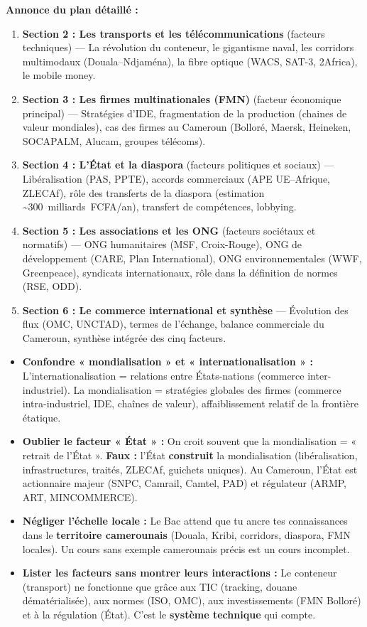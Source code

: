 \documentclass[11pt]{article}
\begin{document}
\textbf{Annonce du plan détaillé :}
\begin{enumerate}
    \item \textbf{Section 2 : Les transports et les télécommunications} (facteurs techniques) — La révolution du conteneur, le gigantisme naval, les corridors multimodaux (Douala–Ndjaména), la fibre optique (WACS, SAT-3, 2Africa), le mobile money.
    \item \textbf{Section 3 : Les firmes multinationales (FMN)} (facteur économique principal) — Stratégies d'IDE, fragmentation de la production (chaines de valeur mondiales), cas des firmes au Cameroun (Bolloré, Maersk, Heineken, SOCAPALM, Alucam, groupes télécoms).
    \item \textbf{Section 4 : L'État et la diaspora} (facteurs politiques et sociaux) — Libéralisation (PAS, PPTE), accords commerciaux (APE UE–Afrique, ZLECAf), rôle des transferts de la diaspora (estimation \textasciitilde \SI{300}{milliards FCFA/an}), transfert de compétences, lobbying.
    \item \textbf{Section 5 : Les associations et les ONG} (facteurs sociétaux et normatifs) — ONG humanitaires (MSF, Croix-Rouge), ONG de développement (CARE, Plan International), ONG environnementales (WWF, Greenpeace), syndicats internationaux, rôle dans la définition de normes (RSE, ODD).
    \item \textbf{Section 6 : Le commerce international et synthèse} — Évolution des flux (OMC, UNCTAD), termes de l'échange, balance commerciale du Cameroun, synthèse intégrée des cinq facteurs.
\end{enumerate}

\begin{attention}
\begin{itemize}
    \item \textbf{Confondre « mondialisation » et « internationalisation » :} L'internationalisation = relations entre États-nations (commerce inter-industriel). La mondialisation = stratégies globales des firmes (commerce intra-industriel, IDE, chaînes de valeur), affaiblissement relatif de la frontière étatique.
    \item \textbf{Oublier le facteur « État » :} On croit souvent que la mondialisation = « retrait de l'État ». \textbf{Faux :} l'État \textbf{construit} la mondialisation (libéralisation, infrastructures, traités, ZLECAf, guichets uniques). Au Cameroun, l'État est actionnaire majeur (SNPC, Camrail, Camtel, PAD) et régulateur (ARMP, ART, MINCOMMERCE).
    \item \textbf{Négliger l'échelle locale :} Le Bac attend que tu ancre tes connaissances dans le \textbf{territoire camerounais} (Douala, Kribi, corridors, diaspora, FMN locales). Un cours sans exemple camerounais précis est un cours incomplet.
    \item \textbf{Lister les facteurs sans montrer leurs interactions :} Le conteneur (transport) ne fonctionne que grâce aux TIC (tracking, douane dématérialisée), aux normes (ISO, OMC), aux investissements (FMN Bolloré) et à la régulation (État). C'est le \textbf{système technique} qui compte.
\end{itemize}
\end{attention}
\end{document}
